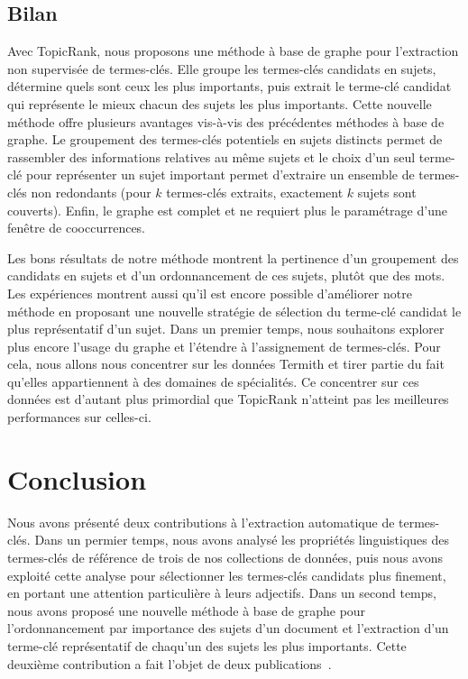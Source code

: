       \subsection{Bilan}
      \label{subsec:main:domain_independent_keyphrase_extraction-unsupervised_automatic_keyphrase_extraction-bilan}
        Avec TopicRank, nous proposons une méthode à base de graphe pour
        l'extraction non supervisée de termes-clés. Elle groupe les termes-clés
        candidats en sujets, détermine quels sont ceux les plus importants, puis
        extrait le terme-clé candidat qui représente le mieux chacun des sujets
        les plus importants. Cette nouvelle méthode offre plusieurs avantages
        vis-à-vis des précédentes méthodes à base de graphe. Le groupement des
        termes-clés potentiels en sujets distincts permet de rassembler des
        informations relatives au même sujets et le choix d'un seul terme-clé
        pour représenter un sujet important permet d'extraire un ensemble de
        termes-clés non redondants (pour $k$ termes-clés extraits, exactement
        $k$ sujets sont couverts). Enfin, le graphe est complet et ne requiert
        plus le paramétrage d'une fenêtre de cooccurrences.

        Les bons résultats de notre méthode montrent la pertinence d'un
        groupement des candidats en sujets et d'un ordonnancement de ces sujets,
        plutôt que des mots. Les expériences montrent aussi qu'il est encore
        possible d'améliorer notre méthode en proposant une nouvelle stratégie
        de sélection du terme-clé candidat le plus représentatif d'un sujet.
        Dans un premier temps, nous souhaitons explorer plus encore l'usage du
        graphe et l'étendre à l'assignement de termes-clés. Pour cela, nous
        allons nous concentrer sur les données Termith et tirer partie du fait
        qu'elles appartiennent à des domaines de spécialités. Ce concentrer sur
        ces données est d'autant plus primordial que TopicRank n'atteint pas les
        meilleures performances sur celles-ci.


  \section{Conclusion}
  \label{sec:main-domain_independent_keyphrase_extraction-conclusion}
    Nous avons présenté deux contributions à l'extraction automatique de
    termes-clés. Dans un permier temps, nous avons analysé les propriétés
    linguistiques des termes-clés de référence de trois de nos collections de
    données, puis nous avons exploité cette analyse pour sélectionner les
    termes-clés candidats plus finement, en portant une attention particulière à
    leurs adjectifs. Dans un second temps, nous avons proposé une nouvelle
    méthode à base de graphe pour l'ordonnancement par importance des sujets
    d'un document et l'extraction d'un terme-clé représentatif de chaqu'un des
    sujets les plus importants. Cette deuxième contribution a fait l'objet de
    deux publications~\cite{bougouin2013topicrank,bougouin2014topicrank}.

